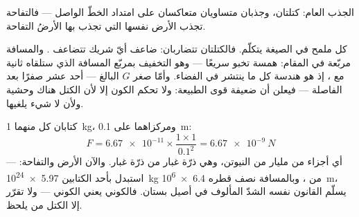 \begin{omfigure}

{\small الجذب العام: كتلتان، وجذبان متساويان متعاكسان على
امتداد الخطّ الواصل --- فالتفاحة تجذب الأرض  نفسها التي
تجذب بها الأرضُ التفاحة.}
\end{omfigure}

\begin{example}\label{ex:g9:gravitation:reading}
كل ملمح في الصيغة يتكلّم. فالكتلتان تتضاربان: ضاعف أيّ شريك
تتضاعف . والمسافة مربّعة في المقام:  همسة تخبو
سريعًا --- وهو التخفيف بمربّع المسافة الذي ستلقاه ثانية مع
 ، إذ هو هندسة كل ما ينتشر في الفضاء. وأمّا صغر $G$
البالغ --- أحد عشر صفرًا بعد الفاصلة --- فيعلن أن  ضعيفة
قوى الطبيعة: ولا تحكم الكون إلا لأن الكتل هناك وحشية ولأن لا
شيء يلغيها.
\end{example}

\begin{example}\label{ex:g9:gravitation:books}
كتابان  كل منهما \qty{1}{kg}، ومركزاهما على \qty{0.1}{m}:
\[
F = \num{6.67e-11} \times \frac{1 \times 1}{0.1^2}
= \qty{6.67e-9}{N}
\]
--- أي أجزاء من مليار من النيوتن، وهي  ذرّة غبار من ذرّة
غبار. والآن الأرض والتفاحة: استبدل بأحد الكتابين
\qty{5.97e24}{kg} من ، وبالمسافة نصف قطره
\qty{6.4e6}{m}، يسلّم القانون نفسه الشدّ المألوف في أصيل
بستان. فالكوني يعني الكوني --- ولا تقرّر إلا الكتل من يلحظ.
\end{example}

